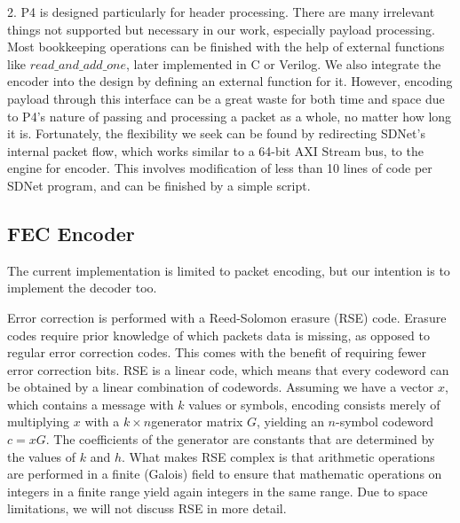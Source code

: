 2. P4 is designed particularly for header processing. There are many
irrelevant  things not supported but
necessary in our work, especially payload processing. Most bookkeeping operations can be finished with the
help of external functions like $read\_and\_add\_one$, later implemented in C or Verilog. We also integrate the encoder
into the design by defining an external function for it. However, encoding payload through this interface can be a
great waste for both time and space due to P4's nature of passing and processing a packet as a whole, no matter how long it is. Fortunately, the
flexibility we seek can be found by redirecting SDNet's internal packet flow, which works similar to a 64-bit AXI Stream bus,
to the engine for encoder. This involves modification of less than 10 lines of code per SDNet program, and can be finished by a simple script.
\fi

\subsection{FEC Encoder}
\label{sec:impl:fec-encoder}

The current implementation is limited to packet encoding, but our intention is
to implement the decoder too.

Error correction is performed with a Reed-Solomon erasure (RSE) code.  Erasure codes
require prior knowledge of which packets data is missing, as opposed to regular
error correction codes.  This comes with the benefit of requiring fewer error
correction bits.  RSE is a linear code, which means that every codeword can be
obtained by a linear combination of codewords.  Assuming we have a vector $x$,
which contains a message with $k$ values or symbols, encoding consists merely
of multiplying $x$ with a $k \times n$generator matrix $G$, yielding an $n$-symbol
codeword $c = xG$.  The coefficients of the
generator are constants that are determined by the values of $k$ and $h$.  What
makes RSE complex is that arithmetic operations are performed in a finite (Galois)
field to ensure that mathematic operations on integers in a finite range yield
again integers in the same range.  Due to space limitations, we will not discuss
RSE in more detail.

